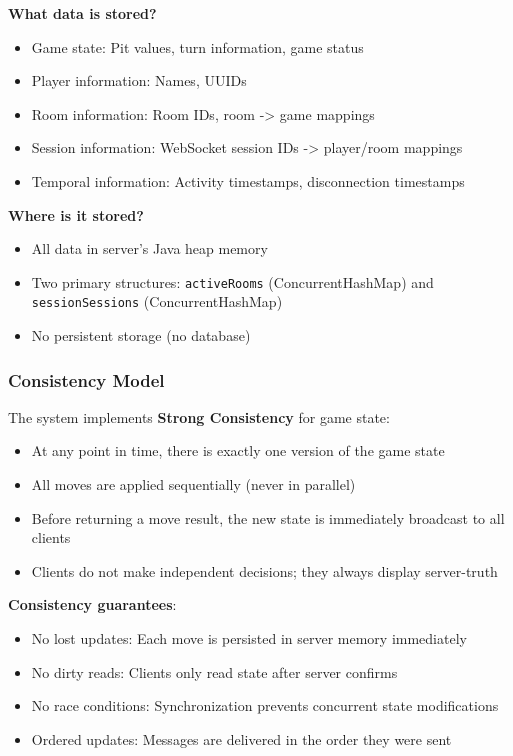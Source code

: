 \documentclass{scrartcl}
\begin{document}
\textbf{What data is stored?}

\begin{itemize}
  \item Game state: Pit values, turn information, game status
  \item Player information: Names, UUIDs
  \item Room information: Room IDs, room -> game mappings
  \item Session information: WebSocket session IDs -> player/room mappings
  \item Temporal information: Activity timestamps, disconnection timestamps
\end{itemize}

\textbf{Where is it stored?}

\begin{itemize}
  \item All data in server's Java heap memory
  \item Two primary structures: \texttt{activeRooms} (ConcurrentHashMap) and \texttt{sessionSessions} (ConcurrentHashMap)
  \item No persistent storage (no database)
\end{itemize}


\subsubsection{Consistency Model}

The system implements \textbf{Strong Consistency} for game state:

\begin{itemize}
  \item At any point in time, there is exactly one version of the game state
  \item All moves are applied sequentially (never in parallel)
  \item Before returning a move result, the new state is immediately broadcast to all clients
  \item Clients do not make independent decisions; they always display server-truth
\end{itemize}

\textbf{Consistency guarantees}:

\begin{itemize}
  \item No lost updates: Each move is persisted in server memory immediately
  \item No dirty reads: Clients only read state after server confirms
  \item No race conditions: Synchronization prevents concurrent state modifications
  \item Ordered updates: Messages are delivered in the order they were sent
\end{itemize}
\end{document}
